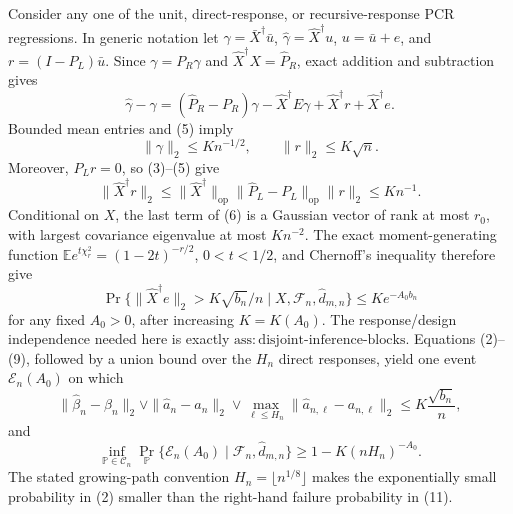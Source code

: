 Consider any one of the unit, direct-response, or recursive-response PCR regressions.  In generic notation let \(\gamma=\bar X^\dagger\bar u\), \(\widehat\gamma=\widehat X^\dagger u\), \(u=\bar u+e\), and \(r=(I-P_L)\bar u\).  Since \(\gamma=P_R\gamma\) and \(\widehat X^\dagger X=\widehat P_R\), exact addition and subtraction gives
\[
 \widehat\gamma-\gamma
 = (\widehat P_R-P_R)\gamma
   -\widehat X^\dagger E\gamma
   +\widehat X^\dagger r
   +\widehat X^\dagger e .
 \tag{6}
\]
Bounded mean entries and (5) imply
\[
 \|\gamma\|_2\le K n^{-1/2},\qquad \|r\|_2\le K\sqrt n.
 \tag{7}
\]
Moreover, \(P_Lr=0\), so (3)--(5) give
\[
 \|\widehat X^\dagger r\|_2
 \le \|\widehat X^\dagger\|_{\mathrm{op}}
      \|\widehat P_L-P_L\|_{\mathrm{op}}\|r\|_2
 \le K n^{-1}.
 \tag{8}
\]
Conditional on \(X\), the last term of (6) is a Gaussian vector of rank at most \(r_0\), with largest covariance eigenvalue at most \(K n^{-2}\).  The exact moment-generating function
\(\mathbb E e^{t\chi_r^2}=(1-2t)^{-r/2}\), \(0<t<1/2\), and Chernoff's inequality therefore give
\[
 \Pr\{\|\widehat X^\dagger e\|_2>K\sqrt{b_n}/n\mid X,\mathcal F_n,\widehat d_{m,n}\}
 \le K e^{-A_0b_n}
 \tag{9}
\]
for any fixed \(A_0>0\), after increasing \(K=K(A_0)\).  The response/design independence needed here is exactly \(\mathrm{ass{:}disjoint\mbox{-}inference\mbox{-}blocks}\).  Equations (2)--(9), followed by a union bound over the \(H_n\) direct responses, yield one event \(\mathcal E_n(A_0)\) on which
\[
 \|\widehat\beta_n-\beta_n\|_2
 \vee\|\widehat a_n-a_n\|_2
 \vee\max_{\ell\le H_n}\|\widehat a_{n,\ell}-a_{n,\ell}\|_2
 \le K\frac{\sqrt{b_n}}n,
 \tag{10}
\]
and
\[
 \inf_{\mathbb P\in\mathcal C_n}
 \Pr_{\mathbb P}\{\mathcal E_n(A_0)\mid\mathcal F_n,\widehat d_{m,n}\}
 \ge1-K(nH_n)^{-A_0}.
 \tag{11}
\]
The stated growing-path convention \(H_n=\lfloor n^{1/8}\rfloor\) makes the exponentially small probability in (2) smaller than the right-hand failure probability in (11).

